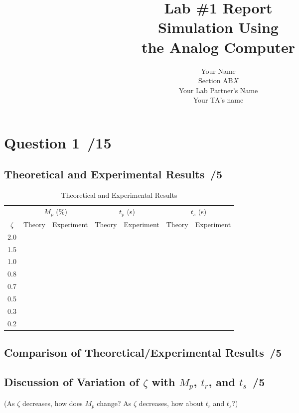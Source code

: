 \documentclass{article}
\title{\bf Lab \#1 Report\\{\sc Simulation Using \\the Analog Computer}}
\author{Your Name\\ Section AB\emph{X}\\
  Your Lab Partner's Name\\
  Your TA's name}
\newcommand{\score}{\hfill \underline{\hspace{0.65cm}}\,/} %
\begin{document}
\maketitle
\noindent {}
\section*{Question 1 \score 15}
\subsection*{Theoretical and Experimental Results \score 5}
\begin{table}[phtb] \label{tbl:lab1_q1}
  \begin{center}
    \caption{Theoretical and Experimental Results}
    \begin{tabular}{c|rr|rr|rr} \hline \hline
      & \multicolumn{2}{c}{$M_p$ (\%)} & \multicolumn{2}{c}{$t_p$ (s)} & \multicolumn{2}{c}{$t_s$ (s)} \\ \cline{2-7} %
      $\zeta$ & Theory & Experiment & Theory & Experiment & Theory & Experiment \\
      \hline
      2.0 & &&&&&\\ 
      1.5 & &&&&&\\
      1.0 & &&&&&\\
      0.8 & &&&&&\\
      0.7 & &&&&&\\
      0.5 & &&&&&\\
      0.3 & &&&&&\\
      0.2 & &&&&& \\ \hline 
    \end{tabular} 
    \end{center}
\end{table}
\subsection*{Comparison of Theoretical/Experimental Results \score 5}

\subsection*{Discussion of Variation of $\zeta$ with $M_p$, $t_r$, and $t_s$ \score 5}
(As $\zeta$ decreases, how does $M_p$ change? As $\zeta$ decreases, how about $t_r$ and $t_s$?)
\end{document}
